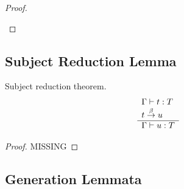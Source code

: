 \begin{theorem}
\begin{proof}
\begin{enumerate}
        \end{enumerate}
    \end{proof}
\end{theorem}



\subsection{Subject Reduction Lemma}

\begin{theorem}
    \label{subject-reduction-theorem}
    Subject reduction theorem.
    $$
    \begin{array}{l} 
        \Gamma \vdash t: T
        \\
        t \stackrel{\beta}{\to} u
     \\ \hline 
        \Gamma \vdash u: T
    \end{array}
    $$

    \begin{proof} MISSING
    \end{proof}
\end{theorem}





\subsection{Generation Lemmata}



